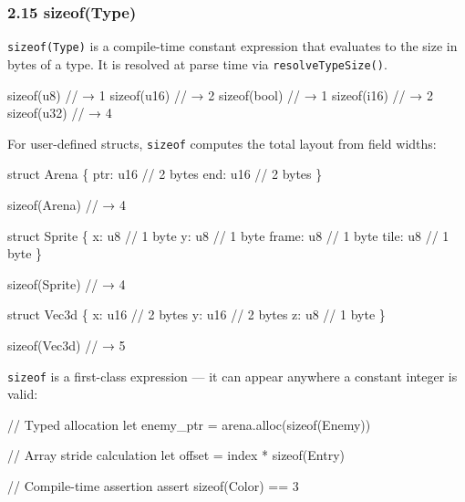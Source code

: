 \documentclass[
  11pt,
]{article}
\newenvironment{Shaded}{\begin{snugshade}}{\end{snugshade}}
\newcommand{\NormalTok}[1]{#1}
\begin{document}
\hypertarget{sizeoftype}{%
\subsubsection{2.15 sizeof(Type)}\label{sizeoftype}}

\texttt{sizeof(Type)} is a compile-time constant expression that
evaluates to the size in bytes of a type. It is resolved at parse time
via \texttt{resolveTypeSize()}.

\begin{Shaded}
\begin{Highlighting}[]
\NormalTok{sizeof(u8)     // → 1}
\NormalTok{sizeof(u16)    // → 2}
\NormalTok{sizeof(bool)   // → 1}
\NormalTok{sizeof(i16)    // → 2}
\NormalTok{sizeof(u32)    // → 4}
\end{Highlighting}
\end{Shaded}

For user-defined structs, \texttt{sizeof} computes the total layout from
field widths:

\begin{Shaded}
\begin{Highlighting}[]
\NormalTok{struct Arena \{}
\NormalTok{    ptr: u16    // 2 bytes}
\NormalTok{    end: u16    // 2 bytes}
\NormalTok{\}}

\NormalTok{sizeof(Arena)   // → 4}

\NormalTok{struct Sprite \{}
\NormalTok{    x: u8       // 1 byte}
\NormalTok{    y: u8       // 1 byte}
\NormalTok{    frame: u8   // 1 byte}
\NormalTok{    tile: u8    // 1 byte}
\NormalTok{\}}

\NormalTok{sizeof(Sprite)  // → 4}

\NormalTok{struct Vec3d \{}
\NormalTok{    x: u16      // 2 bytes}
\NormalTok{    y: u16      // 2 bytes}
\NormalTok{    z: u8       // 1 byte}
\NormalTok{\}}

\NormalTok{sizeof(Vec3d)   // → 5}
\end{Highlighting}
\end{Shaded}

\texttt{sizeof} is a first-class expression --- it can appear anywhere a
constant integer is valid:

\begin{Shaded}
\begin{Highlighting}[]
\NormalTok{// Typed allocation}
\NormalTok{let enemy\_ptr = arena.alloc(sizeof(Enemy))}

\NormalTok{// Array stride calculation}
\NormalTok{let offset = index * sizeof(Entry)}

\NormalTok{// Compile{-}time assertion}
\NormalTok{assert sizeof(Color) == 3}
\end{Highlighting}
\end{Shaded}
\end{document}
